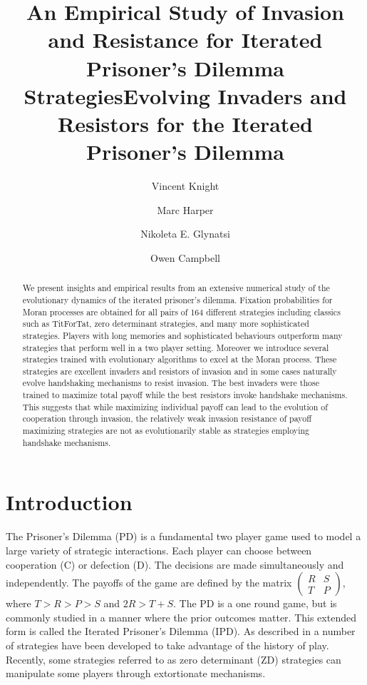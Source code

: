 \documentclass{article}
\title{An Empirical Study of Invasion and Resistance
       for Iterated Prisoner's Dilemma Strategies}
\title{Evolving Invaders and Resistors for the Iterated Prisoner's Dilemma}
\author{Vincent Knight \and
        Marc Harper \and
        Nikoleta E. Glynatsi \and
        Owen Campbell} %
\date{}
\begin{document}
\maketitle

\begin{abstract}
    We present insights and empirical results from an extensive numerical
    study of the evolutionary dynamics of the iterated prisoner's dilemma.
    Fixation probabilities for Moran processes are obtained
    for all pairs of 164 different strategies including classics such as TitForTat, zero
    determinant strategies, and many more sophisticated strategies.
    Players with long memories and sophisticated behaviours outperform
    many strategies that perform well in a two player setting. Moreover we
    introduce several strategies trained with evolutionary algorithms to
    excel at the Moran process. These strategies are excellent invaders
    and resistors of invasion and in some cases naturally evolve handshaking
    mechanisms to resist invasion. The best invaders were those trained
    to maximize total payoff while the best resistors invoke handshake mechanisms.
    This suggests that while maximizing individual payoff
    can lead to the evolution of cooperation through invasion, the relatively
    weak invasion resistance of payoff maximizing strategies are not as
    evolutionarily stable as strategies employing handshake mechanisms.
\end{abstract}

\section{Introduction}\label{sec:introduction}

The Prisoner's Dilemma (PD) \cite{Flood1958} is a fundamental two player game
used to model a large variety of strategic interactions. Each player can choose
between cooperation (C) or defection (D). The decisions are made simultaneously
and independently. The payoffs of
the game are defined by the matrix $\begin{pmatrix} R & S \\ T & P
\end{pmatrix}$, where $T > R > P > S$ and $2R > T + S$. The PD is a one
round game, but is commonly studied in a manner where the prior outcomes
matter. This extended form is called the Iterated Prisoner's
Dilemma (IPD). As described in \cite{Axelrod1980a, Knight2016, Press2012} a
number of strategies have been developed to take advantage of the history of
play. Recently, some strategies referred to as zero determinant (ZD) strategies
\cite{Press2012} can manipulate some players through extortionate mechanisms.
\end{document}
